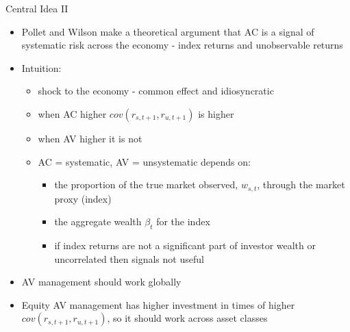 \documentclass{beamer}
\begin{document}
\begin{frame}{Central Idea II}
	\begin{itemize}[<+->]
		\item Pollet and Wilson make a theoretical argument that AC is a signal of systematic risk across the economy - index returns and unobservable returns
		\item Intuition:
		\begin{itemize}[<+->]
			\item shock to the economy - common effect and idiosyncratic
			\item when AC higher $cov(r_{s,t+1},r_{u,t+1})$ is higher
			\item when AV higher it is not
			\item AC = systematic, AV = unsystematic depends on:
			\begin{itemize}[<+->]
				\item the proportion of the true market observed, $w_{s,t}$, through the market proxy (index)
				\item the aggregate wealth $\beta_{t}$ for the index
				\item if index returns are not a significant part of investor wealth or uncorrelated then signals not useful
			\end{itemize}
		\end{itemize}
		\item AV management should work globally
		\item Equity AV management has higher investment in times of higher $cov(r_{s,t+1},r_{u,t+1})$, so it should work across asset classes
	\end{itemize}
\end{frame}

\end{document}
